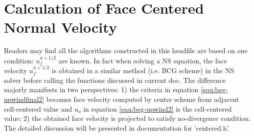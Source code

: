 \section{Calculation of Face Centered Normal Velocity}
Readers may find all the algorithms constructed in this headfile are based on one condition: $u_f^{n+1/2}$ are known. In fact when solving a NS equation, the face velocity $u_f^{n+1/2}$ is obtained in a similar method (i.e. BCG scheme) in the NS solver before calling the functions discussed in current doc\cite{2003_Popinet}. The difference majorly manifests in two perspectives: 1) the criteria in equation \ref{equ:beg-upwindfinal2} becomes face velocity computed by center scheme from adjacent cell-centered value and $u_o$ in equation \ref{equ:beg-upwind2} is the cell-centered value; 2) the obtained face velocity is projected to satisfy no-divergence condition. The detailed discussion will be presented in documentation for 'centered.h'.
\printbibliography
